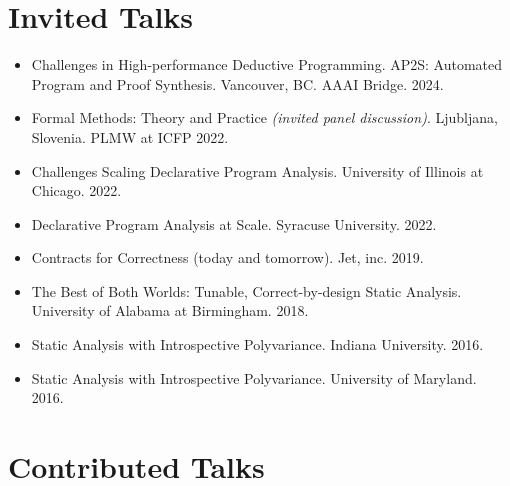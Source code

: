 \documentclass[line]{res}
\begin{document}
\begin{resume}
\section{\large Invited Talks} \vspace{0.2in}
\begin{itemize}
\item Challenges in High-performance Deductive Programming. AP2S: Automated Program and Proof Synthesis. Vancouver, BC. AAAI Bridge. 2024. 
\item Formal Methods: Theory and Practice \textit{(invited panel discussion)}. Ljubljana, Slovenia. PLMW at ICFP 2022.
\item Challenges Scaling Declarative Program Analysis. University of Illinois at Chicago. 2022.
\item Declarative Program Analysis at Scale. Syracuse University. 2022.
\item Contracts for Correctness (today and tomorrow). Jet, inc. 2019.
\item The Best of Both Worlds: Tunable, Correct-by-design Static Analysis. University of Alabama at Birmingham. 2018.
\item Static Analysis with Introspective Polyvariance. Indiana University. 2016.
\item Static Analysis with Introspective Polyvariance. University of Maryland. 2016.
\end{itemize}

\section{\large Contributed Talks} \vspace{0.2in}



\end{resume}

\end{document}
